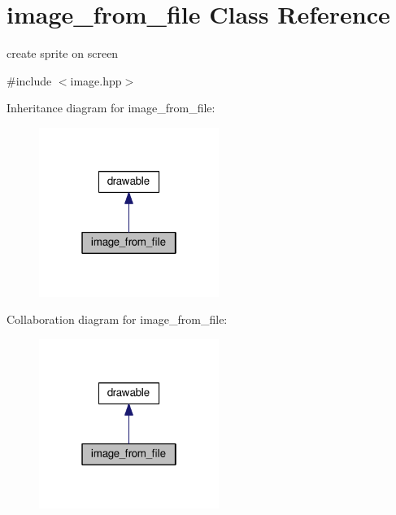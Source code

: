 \hypertarget{classimage__from__file}{}\section{image\+\_\+from\+\_\+file Class Reference}
\label{classimage__from__file}


create sprite on screen  




{\ttfamily \#include $<$image.\+hpp$>$}



Inheritance diagram for image\+\_\+from\+\_\+file\+:\nopagebreak
\begin{figure}[H]
\begin{center}
\leavevmode
\includegraphics[width=166pt]{classimage__from__file__inherit__graph}
\end{center}
\end{figure}


Collaboration diagram for image\+\_\+from\+\_\+file\+:\nopagebreak
\begin{figure}[H]
\begin{center}
\leavevmode
\includegraphics[width=166pt]{classimage__from__file__coll__graph}
\end{center}
\end{figure}
